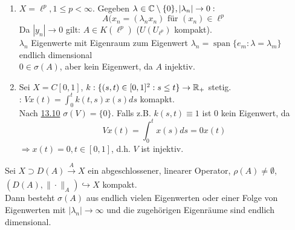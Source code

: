 \begin{beispiel}
	\begin{enumerate}[label=\alph*\upshape)]
		\item $X = \ell^{p}, 1 \leq p < \infty$. Gegeben $\lambda_{} \in \mathbb{C} \setminus \{ 0 \}, | \lambda_{n} | \rightarrow 0:$
			\[ A(x_{n} = (\lambda_{n} x_{n}) \text{ für } (x_{n}) \in \ell^{p} \]
			Da $| y_{n} | \rightarrow 0$ gilt: $A \in K(\ell^{p})$ ($U(U_{\ell^{p}})$ kompakt). \\
			$\lambda_{n}$ Eigenwerte mit Eigenraum zum Eigenwert $\lambda_{n} = \operatorname{span}\{ e_{m}: \lambda = \lambda_{m} \}$ endlich dimensional \\
			$0 \in \sigma(A)$, aber kein Eigenwert, da $A$ injektiv.
		\item Sei $X = C[0, 1]$, $k: \{ (s, t) \in [0, 1]^{2}: s \leq t \} \rightarrow \mathbb{R}_{+}$ stetig. \\
			: $V x(t) = \int_{0}^{t} k(t, s) x(s) ds$ komapkt. \\
			Nach \hyperref[]{13.10} $\sigma(V) = \{ 0 \}$. %
			Falls z.B. $k(s, t) \equiv 1$ ist $0$ kein Eigenwert, da 
			\[ V x(t) = \int_{0}^{t} x(s) ds = 0 x(t) \]
			$\Rightarrow x(t) = 0, t \in [0, 1]$, d.h. $V$ ist injektiv.
	\end{enumerate}	
\end{beispiel}


\begin{satz}
	Sei $X \supset D(A) \xrightarrow[]{A} X$ ein abgeschlossener, linearer Operator, $\rho(A) \neq \emptyset$, $(D(A), \| \cdot \|_{A}) \hookrightarrow X$ kompakt. \\
	Dann besteht $\sigma(A)$ aus endlich vielen Eigenwerten oder einer Folge von Eigenwerten mit $|\lambda_{n}| \rightarrow \infty$ und die zugehörigen Eigenräume sind endlich dimensional.
\end{satz}




\newpage